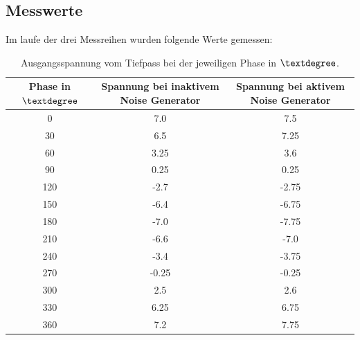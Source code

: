 \documentclass[
  bibliography=totoc,     %
  captions=tableheading,  %
  titlepage=firstiscover, %
]{scrartcl}
\begin{document}
\subsection{Messwerte}
Im laufe der drei Messreihen wurden folgende Werte gemessen:
\begin{table}
  \centering
  \caption{Ausgangsspannung vom Tiefpass bei der jeweiligen Phase in $\textdegree$.}
  \label{tab:Phasenverlauf}
  \begin{tabular}{S[table-format=3.0] S S}
    \toprule
     {Phase in $\textdegree$} & {Spannung bei inaktivem Noise Generator} & {Spannung bei aktivem Noise Generator} \\
     & 7.0 & 7.5 \\
    30 & 6.5 & 7.25 \\
    60 & 3.25 & 3.6 \\
    90 & 0.25 & 0.25 \\
    120 & -2.7 & -2.75 \\
    150 & -6.4 & -6.75 \\
    180 & -7.0 & -7.75 \\
    210 & -6.6 & -7.0 \\
    240 & -3.4 & -3.75 \\
    270 & -0.25 & -0.25 \\
    300 & 2.5 & 2.6 \\
    330 & 6.25 & 6.75 \\
    360 & 7.2 & 7.75 \\
    \bottomrule
  \end{tabular}
\end{table}
\end{document}
